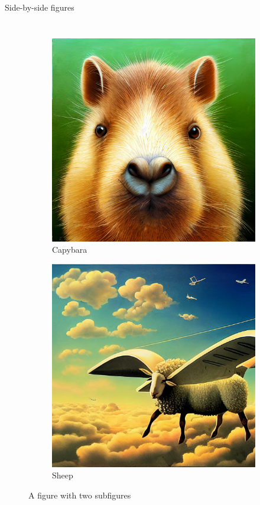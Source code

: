\documentclass[aspectratio=169]{beamer}
\begin{document}
\begin{frame}[fragile]{Side-by-side figures}
\begin{columns}
\begin{figure}[h]
	\centering
	\begin{subfigure}{.5\textwidth}
		\centering
		\includegraphics[width=.9\linewidth]{curiouscbara}
		\caption{Capybara}
		\label{fig:sub1}
	\end{subfigure}%
	\begin{subfigure}{.5\textwidth}
		\centering
		\includegraphics[width=.9\linewidth]{sheep}
		\caption{Sheep}
		\label{fig:sub2}
	\end{subfigure}
	\caption{A figure with two subfigures}
	\label{fig:test}
\end{figure}

		\end{columns}
	\end{frame}
	
\end{document}
